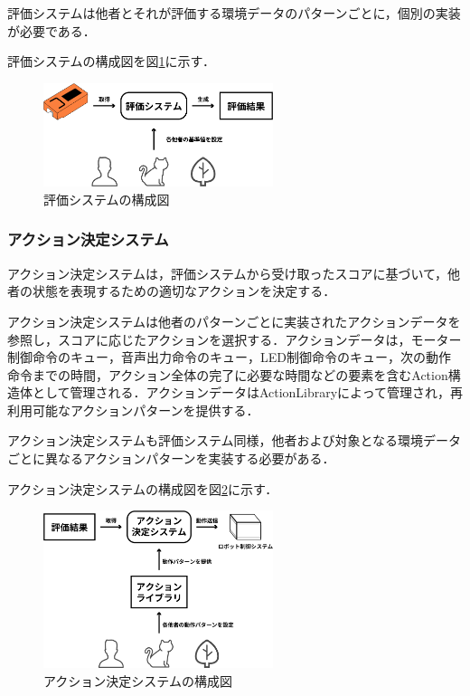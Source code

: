 \documentclass{cuxarticle}
\begin{document}
評価システムは他者とそれが評価する環境データのパターンごとに，個別の実装が必要である．

評価システムの構成図を図\ref{fig:evaluation-system}に示す．

\begin{figure}[h]
  \centering
  \includegraphics[keepaspectratio, width=0.6\textwidth]{resources/evaluation-system.png}
  \caption[short]{評価システムの構成図}
  \label{fig:evaluation-system}
\end{figure}

\subsubsection{アクション決定システム}
アクション決定システムは，評価システムから受け取ったスコアに基づいて，他者の状態を表現するための適切なアクションを決定する．

アクション決定システムは他者のパターンごとに実装されたアクションデータを参照し，スコアに応じたアクションを選択する．アクションデータは，モーター制御命令のキュー，音声出力命令のキュー，LED制御命令のキュー，次の動作命令までの時間，アクション全体の完了に必要な時間などの要素を含むAction構造体として管理される．アクションデータはActionLibraryによって管理され，再利用可能なアクションパターンを提供する．

アクション決定システムも評価システム同様，他者および対象となる環境データごとに異なるアクションパターンを実装する必要がある．

アクション決定システムの構成図を図\ref{fig:action-decision-system}に示す．

\begin{figure}[h]
  \centering
  \includegraphics[keepaspectratio, width=0.6\textwidth]{resources/action-decision-system.png}
  \caption[short]{アクション決定システムの構成図}
  \label{fig:action-decision-system}
\end{figure}
\end{document}
